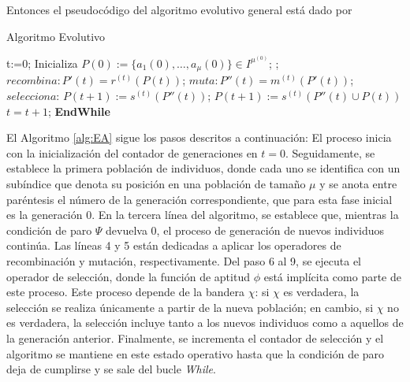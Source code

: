 Entonces el pseudocódigo del algoritmo evolutivo general está dado por

\begin{algorithm}
    \caption{Algoritmo Evolutivo}\label{alg:EA}
    \begin{algorithmic}[1] %
    \State t:=0;
    \State Inicializa $P(0):=\{a_1(0),\ldots,a_\mu(0)\} \in I^{\mu^{(0)}}$;
     \do ; 
        \State $\textit{recombina}: P'(t)=r^{(t)}(P(t))$;
        \State $\textit{muta}: P''(t)=m^{(t)}(P'(t))$;
        \State $\textit{selecciona}$:
            \If{$\chi$}
                \State $P(t +1):= s^{(t)}(P''(t))$;
                \Else  $P(t +1):= s^{(t)}(P''(t) \cup P(t))$
            \EndIf
    $t=t+1$;    
    \EndWhile
    \textbf{EndWhile}
\end{algorithmic}
\end{algorithm}

El Algoritmo \ref{alg:EA} sigue los pasos descritos a continuación: El proceso inicia con la inicialización del contador de generaciones en $t=0$. Seguidamente, se establece la primera población de individuos, donde cada uno se identifica con un subíndice que denota su posición en una población de tamaño $\mu$ y se anota entre paréntesis el número de la generación correspondiente, que para esta fase inicial es la generación 0. En la tercera línea del algoritmo, se establece que, mientras la condición de paro $\Psi$ devuelva 0, el proceso de generación de nuevos individuos continúa. Las líneas 4 y 5 están dedicadas a aplicar los operadores de recombinación y mutación, respectivamente. Del paso 6 al 9, se ejecuta el operador de selección, donde la función de aptitud $\phi$ está implícita como parte de este proceso. Este proceso depende de la bandera $\chi$: si $\chi$ es verdadera, la selección se realiza únicamente a partir de la nueva población; en cambio, si $\chi$ no es verdadera, la selección incluye tanto a los nuevos individuos como a aquellos de la generación anterior. Finalmente, se incrementa el contador de selección y el algoritmo se mantiene en este estado operativo hasta que la condición de paro deja de cumplirse y se sale del bucle \textit{While}.

